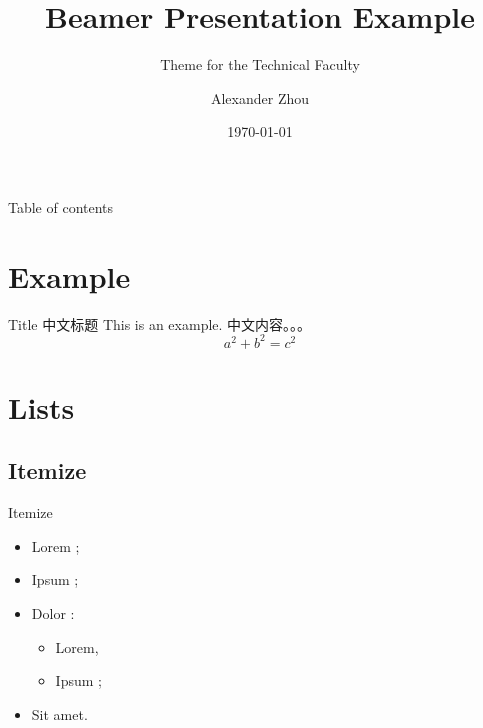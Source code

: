 \documentclass[10pt]{beamer}
\begin{document}
\title[FAU Beamer Theme]{Beamer Presentation Example}
\subtitle{Theme for the Technical Faculty}
\author{Alexander Zhou}
\date{\today}

\begin{frame}[plain]
  \titlepage
\end{frame}


\begin{frame}{Table of contents}
  \tableofcontents
\end{frame}


\section{Example}
\begin{frame}{Title 中文标题}
  This is an example. 中文内容。。。
\begin{equation}
    a^{2}+b^{2}=c^{2}
\end{equation}

\end{frame}


\section{Lists}
\subsection{Itemize}

\begin{frame}{Itemize}
  \begin{itemize}
    \item Lorem ; \pause
    \item Ipsum ;
    \item Dolor : \pause
      \begin{itemize}
        \item Lorem,
        \item Ipsum ;
      \end{itemize}
    \item Sit amet.
  \end{itemize}
\end{frame}
\end{document}

